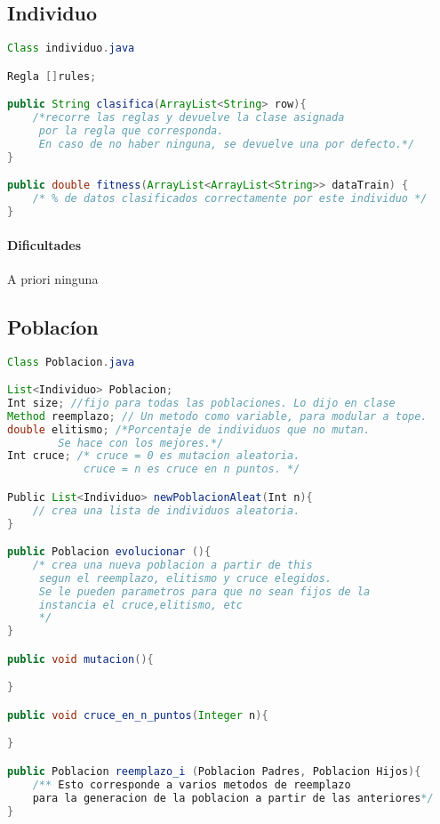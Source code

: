 \documentclass[nochap]{apuntes}
\begin{document}
\subsection{Individuo}

\begin{lstlisting}[language=Java]
Class individuo.java

Regla []rules;

public String clasifica(ArrayList<String> row){
	/*recorre las reglas y devuelve la clase asignada
	 por la regla que corresponda.
	 En caso de no haber ninguna, se devuelve una por defecto.*/
}

public double fitness(ArrayList<ArrayList<String>> dataTrain) {
	/* % de datos clasificados correctamente por este individuo */
}

\end{lstlisting}

\paragraph*{Dificultades} A priori ninguna
\subsection{Poblacíon}

\begin{lstlisting}[language=Java]
Class Poblacion.java

List<Individuo> Poblacion;
Int size; //fijo para todas las poblaciones. Lo dijo en clase
Method reemplazo; // Un metodo como variable, para modular a tope.
double elitismo; /*Porcentaje de individuos que no mutan.
		Se hace con los mejores.*/
Int cruce; /* cruce = 0 es mutacion aleatoria.
			cruce = n es cruce en n puntos. */

Public List<Individuo> newPoblacionAleat(Int n){
	// crea una lista de individuos aleatoria.
}

public Poblacion evolucionar (){
	/* crea una nueva poblacion a partir de this
	 segun el reemplazo, elitismo y cruce elegidos.
	 Se le pueden parametros para que no sean fijos de la
	 instancia el cruce,elitismo, etc
	 */
}

public void mutacion(){

}

public void cruce_en_n_puntos(Integer n){

}

public Poblacion reemplazo_i (Poblacion Padres, Poblacion Hijos){
	/** Esto corresponde a varios metodos de reemplazo
	para la generacion de la poblacion a partir de las anteriores*/
}

\end{lstlisting}
\end{document}
